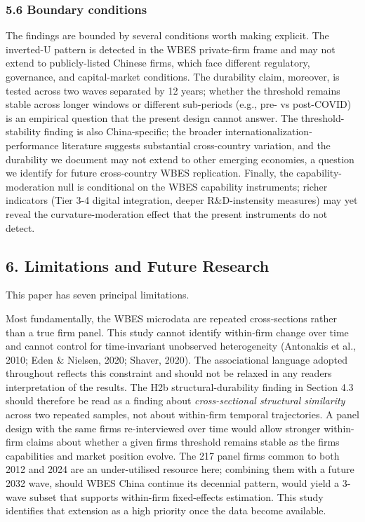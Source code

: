 \documentclass[12pt,a4paper]{article}
\begin{document}
\hypertarget{56-boundary-conditions}{%
\subsubsection{5.6 Boundary conditions}\label{56-boundary-conditions}}

The findings are bounded by several conditions worth making explicit.
The inverted-U pattern is detected in the WBES private-firm frame and
may not extend to publicly-listed Chinese firms, which face different
regulatory, governance, and capital-market conditions. The durability
claim, moreover, is tested across two waves separated by 12 years;
whether the threshold remains stable across longer windows or different
sub-periods (e.g., pre- vs post-COVID) is an empirical question that the
present design cannot answer. The threshold-stability finding is also
China-specific; the broader internationalization-performance literature
suggests substantial cross-country variation, and the durability we
document may not extend to other emerging economies, a question we
identify for future cross-country WBES replication. Finally, the
capability-moderation null is conditional on the WBES capability
instruments; richer indicators (Tier 3-4 digital integration, deeper
R\&D-instensity measures) may yet reveal the curvature-moderation effect
that the present instruments do not detect.

\hypertarget{6-limitations-and-future-research}{%
\subsection{6. Limitations and Future
Research}\label{6-limitations-and-future-research}}

This paper has seven principal limitations.

Most fundamentally, the WBES microdata are repeated cross‑sections
rather than a true firm panel. This study cannot identify within‑firm
change over time and cannot control for time‑invariant unobserved
heterogeneity (Antonakis et al., 2010; Eden \& Nielsen, 2020; Shaver,
2020). The associational language adopted throughout reflects this
constraint and should not be relaxed in any reader\textquotesingle s
interpretation of the results. The H2b structural-durability finding in
Section 4.3 should therefore be read as a finding about
\emph{cross-sectional structural similarity} across two repeated
samples, not about within-firm temporal trajectories. A panel design
with the same firms re-interviewed over time would allow stronger
within-firm claims about whether a given firm\textquotesingle s
threshold remains stable as the firm\textquotesingle s capabilities and
market position evolve. The 217 panel firms common to both 2012 and 2024
are an under-utilised resource here; combining them with a future 2032
wave, should WBES China continue its decennial pattern, would yield a
3-wave subset that supports within-firm fixed-effects estimation. This
study identifies that extension as a high priority once the data become
available.
\end{document}
